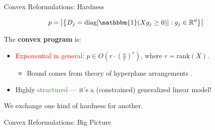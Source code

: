 \documentclass[usenames,dvipsnames,mathserif,notheorems]{beamer}
\newcommand{\red}[1]{\textcolor{Red}{#1}}
\newcommand{\green}[1]{\textcolor{ForestGreen}{#1}}
\begin{document}
\begin{frame}{Convex Reformulations: Hardness}


	\[
		p = \abs{\cbr{D_j = \text{diag}[\mathbbm{1}(X g_j \geq 0)] : g_j \in \R^d }}
	\]

	\vspace{2em}
	\pause

	The \textbf{convex program} is:
	\vspace{0.5em}
	\begin{itemize}
		\item \red{Exponential in general}: \( p \in O(r \cdot (\frac{n}{r})^r) \),
		      where \( r = \text{rank}(X) \).
		      \vspace{0.25em}
		      \begin{itemize}
			      \item Bound comes from theory of hyperplane arrangements \citep{winder1966partitions}.
		      \end{itemize}
		      \pause

		      \vspace{0.5em}

		\item Highly \green{structured} --- it's a (constrained) generalized linear model!
	\end{itemize}

	\vspace{1em}
	\pause

	\begin{center}
		\Large
		We exchange one kind of hardness for another.
	\end{center}

\end{frame}


\begin{frame}{Convex Reformulations: Big Picture}

	\begin{figure}[]
		\centering
		
	\end{figure}

\end{frame}
\end{document}
